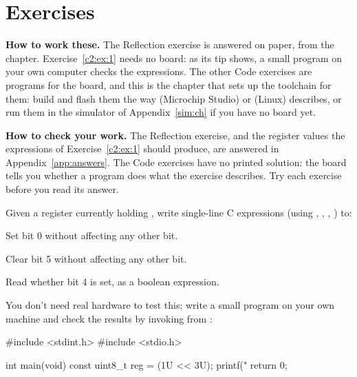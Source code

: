 
\section{Exercises}
\label{c2:sec:exercises}\label{c2:app:b}

\begin{aside}
\textbf{How to work these.} The Reflection exercise is answered on paper, from the chapter.
Exercise~\ref{c2:ex:1} needs no board: as its tip shows, a small program on your own computer checks
the expressions. The other Code exercises are programs for the board, and this is the chapter that
sets up the toolchain for them: build and flash them the way  (Microchip Studio)
or  (Linux) describes, or run them in the simulator of Appendix~\ref{sim:ch} if you
have no board yet.

\textbf{How to check your work.} The Reflection exercise, and the register values the expressions
of Exercise~\ref{c2:ex:1} should produce, are answered in Appendix~\ref{app:answers}. The Code
exercises have no printed solution: the board tells you whether a program does what the exercise
describes. Try each exercise before you read its answer.
\end{aside}

\label{c2:set:1}

\label{c2:ex:1}
Given a register currently holding , write single-line C expressions (using
\code{|}, \code{&}, \code{~}, \code{<<}) to:
\begin{parts}
  \item Set bit 0 without affecting any other bit.
  \item Clear bit 5 without affecting any other bit.
  \item Read whether bit 4 is set, as a boolean expression.
\end{parts}

\note[Tip] You don't need real hardware to test this; write a small program on your own machine and
check the results by invoking  from :

\begin{ccode}
#include <stdint.h>
#include <stdio.h>

int main(void)
{
    const uint8_t reg = (1U << 3U);
    printf("%
    return 0;
}
\end{ccode}

